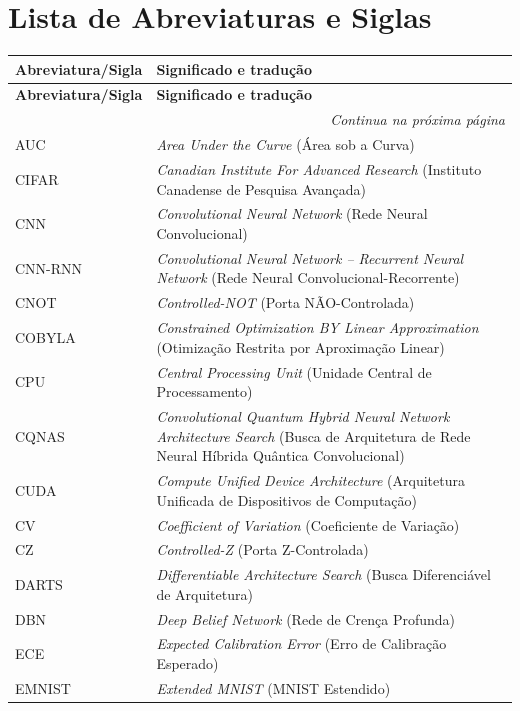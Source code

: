 \documentclass[
    12pt,
    openright,
    oneside,
    a4paper,
    english,
    brazil
]{abntex2}
\begin{document}
\chapter*{Lista de Abreviaturas e Siglas}
\begin{longtable}{@{}p{3.9cm}p{\dimexpr\textwidth-3.9cm-2\tabcolsep\relax}@{}}
\toprule
\textbf{Abreviatura/Sigla} & \textbf{Significado e tradução} \\
\midrule
\endfirsthead
\toprule
\textbf{Abreviatura/Sigla} & \textbf{Significado e tradução} \\
\midrule
\endhead
\midrule
\multicolumn{2}{r}{\footnotesize\textit{Continua na próxima página}} \\
\bottomrule
\endfoot
\bottomrule
\endlastfoot
AUC & \textit{Area Under the Curve} (Área sob a Curva) \\
CIFAR & \textit{Canadian Institute For Advanced Research} (Instituto Canadense de Pesquisa Avançada) \\
CNN & \textit{Convolutional Neural Network} (Rede Neural Convolucional) \\
CNN-RNN & \textit{Convolutional Neural Network -- Recurrent Neural Network} (Rede Neural Convolucional-Recorrente) \\
CNOT & \textit{Controlled-NOT} (Porta NÃO-Controlada) \\
COBYLA & \textit{Constrained Optimization BY Linear Approximation} (Otimização Restrita por Aproximação Linear) \\
CPU & \textit{Central Processing Unit} (Unidade Central de Processamento) \\
CQNAS & \textit{Convolutional Quantum Hybrid Neural Network Architecture Search} (Busca de Arquitetura de Rede Neural Híbrida Quântica Convolucional) \\
CUDA & \textit{Compute Unified Device Architecture} (Arquitetura Unificada de Dispositivos de Computação) \\
CV & \textit{Coefficient of Variation} (Coeficiente de Variação) \\
CZ & \textit{Controlled-Z} (Porta Z-Controlada) \\
DARTS & \textit{Differentiable Architecture Search} (Busca Diferenciável de Arquitetura) \\
DBN & \textit{Deep Belief Network} (Rede de Crença Profunda) \\
ECE & \textit{Expected Calibration Error} (Erro de Calibração Esperado) \\
EMNIST & \textit{Extended MNIST} (MNIST Estendido) \\

\end{longtable}
\end{document}
